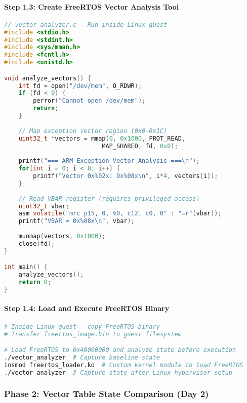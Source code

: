 \documentclass[11pt,a4paper]{article}
\begin{document}
\paragraph{Step 1.3: Create FreeRTOS Vector Analysis Tool}
\begin{lstlisting}[language=c]
// vector_analyzer.c - Run inside Linux guest
#include <stdio.h>
#include <stdint.h>
#include <sys/mman.h>
#include <fcntl.h>
#include <unistd.h>

void analyze_vectors() {
    int fd = open("/dev/mem", O_RDWR);
    if (fd < 0) {
        perror("Cannot open /dev/mem");
        return;
    }
    
    // Map exception vector region (0x0-0x1C)
    uint32_t *vectors = mmap(0, 0x1000, PROT_READ, 
                           MAP_SHARED, fd, 0x0);
    
    printf("=== ARM Exception Vector Analysis ===\n");
    for(int i = 0; i < 8; i++) {
        printf("Vector 0x%02x: 0x%08x\n", i*4, vectors[i]);
    }
    
    // Read VBAR register (requires privileged access)
    uint32_t vbar;
    asm volatile("mrc p15, 0, %0, c12, c0, 0" : "=r"(vbar));
    printf("VBAR = 0x%08x\n", vbar);
    
    munmap(vectors, 0x1000);
    close(fd);
}

int main() {
    analyze_vectors();
    return 0;
}
\end{lstlisting}

\paragraph{Step 1.4: Load and Execute FreeRTOS Binary}
\begin{lstlisting}[language=bash]
# Inside Linux guest - copy FreeRTOS binary
# Transfer freertos_image.bin to guest filesystem

# Load FreeRTOS to 0x40000000 and analyze state before execution
./vector_analyzer  # Capture baseline state
insmod freertos_loader.ko  # Custom kernel module to load FreeRTOS
./vector_analyzer  # Capture state after Linux hypervisor setup
\end{lstlisting}

\subsubsection{Phase 2: Vector Table State Comparison (Day 2)}
\end{document}
